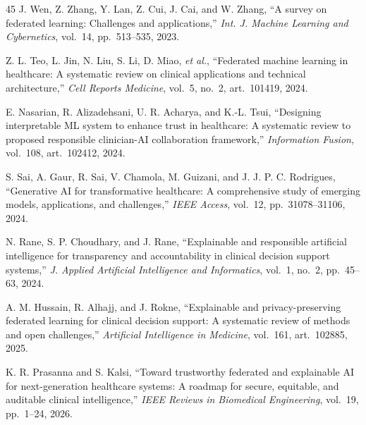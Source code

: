 \documentclass[11pt,a4paper]{article}
\begin{document}
\begin{thebibliography}{45}
 J. Wen, Z. Zhang, Y. Lan, Z. Cui, J. Cai, and W. Zhang, ``A
survey on federated learning: Challenges and applications,'' \emph{Int. J.
Machine Learning and Cybernetics}, vol.~14, pp.~513--535, 2023.

 Z. L. Teo, L. Jin, N. Liu, S. Li, D. Miao, \emph{et al.},
``Federated machine learning in healthcare: A systematic review on clinical
applications and technical architecture,'' \emph{Cell Reports Medicine}, vol.~5,
no.~2, art.~101419, 2024.

 E. Nasarian, R. Alizadehsani, U. R. Acharya, and K.-L. Tsui,
``Designing interpretable ML system to enhance trust in healthcare: A systematic
review to proposed responsible clinician-AI collaboration framework,''
\emph{Information Fusion}, vol.~108, art.~102412, 2024.

 S. Sai, A. Gaur, R. Sai, V. Chamola, M. Guizani, and
J. J. P. C. Rodrigues, ``Generative AI for transformative healthcare: A
comprehensive study of emerging models, applications, and challenges,''
\emph{IEEE Access}, vol.~12, pp.~31078--31106, 2024.

 N. Rane, S. P. Choudhary, and J. Rane, ``Explainable and
responsible artificial intelligence for transparency and accountability in
clinical decision support systems,'' \emph{J. Applied Artificial Intelligence
and Informatics}, vol.~1, no.~2, pp.~45--63, 2024.

 A. M. Hussain, R. Alhajj, and J. Rokne, ``Explainable and
privacy-preserving federated learning for clinical decision support: A
systematic review of methods and open challenges,'' \emph{Artificial
Intelligence in Medicine}, vol.~161, art.~102885, 2025.

 K. R. Prasanna and S. Kalsi, ``Toward trustworthy federated and
explainable AI for next-generation healthcare systems: A roadmap for secure,
equitable, and auditable clinical intelligence,'' \emph{IEEE Reviews in
Biomedical Engineering}, vol.~19, pp.~1--24, 2026.

\end{thebibliography}
\end{document}
